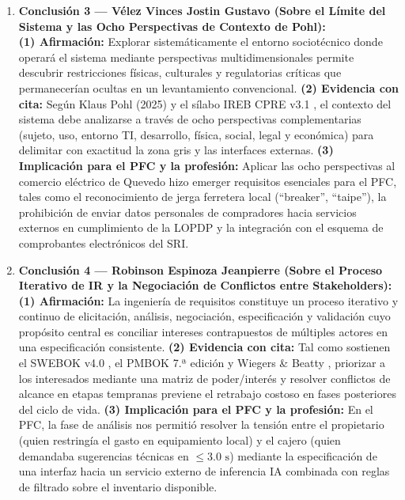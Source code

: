 \begin{enumerate}
	\item \textbf{Conclusión 3 --- Vélez Vinces Jostin Gustavo (Sobre el Límite del Sistema y las Ocho Perspectivas de Contexto de Pohl):} \\
	\textbf{(1) Afirmación:} Explorar sistemáticamente el entorno sociotécnico donde operará el sistema mediante perspectivas multidimensionales permite descubrir restricciones físicas, culturales y regulatorias críticas que permanecerían ocultas en un levantamiento convencional. \textbf{(2) Evidencia con cita:} Según Klaus Pohl (2025) \cite{pohl2025} y el sílabo IREB CPRE v3.1 \cite{ireb2023}, el contexto del sistema debe analizarse a través de ocho perspectivas complementarias (sujeto, uso, entorno TI, desarrollo, física, social, legal y económica) para delimitar con exactitud la zona gris y las interfaces externas. \textbf{(3) Implicación para el PFC y la profesión:} Aplicar las ocho perspectivas al comercio eléctrico de Quevedo hizo emerger requisitos esenciales para el PFC, tales como el reconocimiento de jerga ferretera local (``breaker'', ``taipe''), la prohibición de enviar datos personales de compradores hacia servicios externos en cumplimiento de la LOPDP y la integración con el esquema de comprobantes electrónicos del SRI.
	
	\item \textbf{Conclusión 4 --- Robinson Espinoza Jeanpierre (Sobre el Proceso Iterativo de IR y la Negociación de Conflictos entre Stakeholders):} \\
	\textbf{(1) Afirmación:} La ingeniería de requisitos constituye un proceso iterativo y continuo de elicitación, análisis, negociación, especificación y validación cuyo propósito central es conciliar intereses contrapuestos de múltiples actores en una especificación consistente. \textbf{(2) Evidencia con cita:} Tal como sostienen el SWEBOK v4.0 \cite{swebok2024}, el PMBOK 7.ª edición \cite{pmbok} y Wiegers \& Beatty \cite{wiegers2013}, priorizar a los interesados mediante una matriz de poder/interés y resolver conflictos de alcance en etapas tempranas previene el retrabajo costoso en fases posteriores del ciclo de vida. \textbf{(3) Implicación para el PFC y la profesión:} En el PFC, la fase de análisis nos permitió resolver la tensión entre el propietario (quien restringía el gasto en equipamiento local) y el cajero (quien demandaba sugerencias técnicas en $\le 3.0\text{ s}$) mediante la especificación de una interfaz hacia un servicio externo de inferencia IA combinada con reglas de filtrado sobre el inventario disponible.
	

\end{enumerate}
